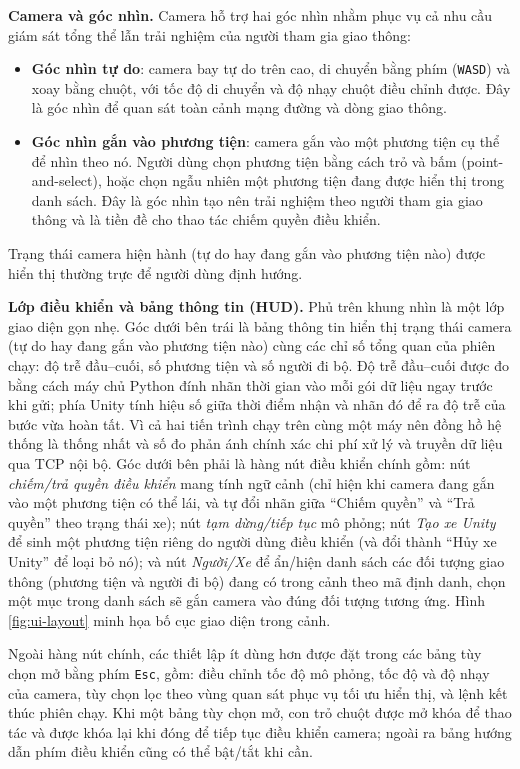 \documentclass[../DoAn.tex]{subfiles}
\begin{document}
\textbf{Camera và góc nhìn.} Camera hỗ trợ hai góc nhìn nhằm phục vụ cả nhu cầu
giám sát tổng thể lẫn trải nghiệm của người tham gia giao thông:
\begin{itemize}[leftmargin=2em]
	\item \textbf{Góc nhìn tự do}: camera bay tự do trên cao, di chuyển bằng phím
	(\texttt{WASD}) và xoay bằng chuột, với tốc độ di chuyển và độ nhạy chuột
	điều chỉnh được. Đây là góc nhìn để quan sát toàn cảnh mạng đường và dòng
	giao thông.
	\item \textbf{Góc nhìn gắn vào phương tiện}: camera gắn vào một phương tiện
	cụ thể để nhìn theo nó. Người dùng chọn phương tiện bằng cách trỏ và bấm
	(point-and-select), hoặc chọn ngẫu nhiên một phương tiện đang được hiển thị trong danh sách. 
	Đây là góc nhìn tạo nên trải nghiệm theo người tham
	gia giao thông và là tiền đề cho thao tác chiếm quyền điều khiển.
\end{itemize}
Trạng thái camera hiện hành (tự do hay đang gắn vào phương tiện nào) được hiển
thị thường trực để người dùng định hướng.

\textbf{Lớp điều khiển và bảng thông tin (HUD).} Phủ trên khung nhìn là một lớp
giao diện gọn nhẹ. Góc dưới bên trái là bảng thông tin hiển thị trạng thái
camera (tự do hay đang gắn vào phương tiện nào) cùng các chỉ số tổng quan của
phiên chạy: độ trễ đầu--cuối, số phương tiện và số người đi bộ. Độ trễ
đầu--cuối được đo bằng cách máy chủ Python đính nhãn thời gian vào mỗi gói dữ
liệu ngay trước khi gửi; phía Unity tính hiệu số giữa thời điểm nhận và nhãn đó
để ra độ trễ của bước vừa hoàn tất. Vì cả hai tiến trình chạy trên cùng một máy
nên đồng hồ hệ thống là thống nhất và số đo phản ánh chính xác chi phí xử lý và
truyền dữ liệu qua TCP nội bộ. Góc dưới bên
phải là hàng nút điều khiển chính gồm: nút \emph{chiếm/trả quyền điều khiển}
mang tính ngữ cảnh (chỉ hiện khi camera đang gắn vào một phương tiện có thể lái,
và tự đổi nhãn giữa ``Chiếm quyền'' và ``Trả quyền'' theo trạng thái xe); nút
\emph{tạm dừng/tiếp tục} mô phỏng; nút \emph{Tạo xe Unity} để sinh một phương
tiện riêng do người dùng điều khiển (và đổi thành ``Hủy xe Unity'' để loại bỏ
nó); và nút \emph{Người/Xe} để ẩn/hiện danh sách các đối tượng giao thông
(phương tiện và người đi bộ) đang có trong cảnh theo mã định danh, chọn một mục
trong danh sách sẽ gắn camera vào đúng đối tượng tương ứng. Hình
\ref{fig:ui-layout} minh họa bố cục giao diện trong cảnh.

Ngoài hàng nút chính, các thiết lập ít dùng hơn được đặt trong các bảng tùy
chọn mở bằng phím \texttt{Esc}, gồm: điều chỉnh tốc độ mô phỏng, tốc độ và độ
nhạy của camera, tùy chọn lọc theo vùng quan sát phục vụ tối ưu hiển thị, và
lệnh kết thúc phiên chạy. Khi một bảng tùy chọn mở, con trỏ chuột được mở khóa
để thao tác và được khóa lại khi đóng để tiếp tục điều khiển camera; ngoài ra
bảng hướng dẫn phím điều khiển cũng có thể bật/tắt khi cần.
\end{document}
